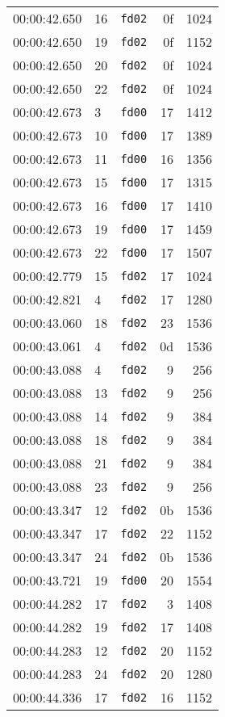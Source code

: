 \documentclass{article}
\begin{document}
\begin{longtable}{lllrr}
00:00:42.650 & 16 & \texttt{fd02} & 0f & 1024 \\
00:00:42.650 & 19 & \texttt{fd02} & 0f & 1152 \\
00:00:42.650 & 20 & \texttt{fd02} & 0f & 1024 \\
00:00:42.650 & 22 & \texttt{fd02} & 0f & 1024 \\
00:00:42.673 & 3 & \texttt{fd00} & 17 & 1412 \\
00:00:42.673 & 10 & \texttt{fd00} & 17 & 1389 \\
00:00:42.673 & 11 & \texttt{fd00} & 16 & 1356 \\
00:00:42.673 & 15 & \texttt{fd00} & 17 & 1315 \\
00:00:42.673 & 16 & \texttt{fd00} & 17 & 1410 \\
00:00:42.673 & 19 & \texttt{fd00} & 17 & 1459 \\
00:00:42.673 & 22 & \texttt{fd00} & 17 & 1507 \\
00:00:42.779 & 15 & \texttt{fd02} & 17 & 1024 \\
00:00:42.821 & 4 & \texttt{fd02} & 17 & 1280 \\
00:00:43.060 & 18 & \texttt{fd02} & 23 & 1536 \\
00:00:43.061 & 4 & \texttt{fd02} & 0d & 1536 \\
00:00:43.088 & 4 & \texttt{fd02} & 9 & 256 \\
00:00:43.088 & 13 & \texttt{fd02} & 9 & 256 \\
00:00:43.088 & 14 & \texttt{fd02} & 9 & 384 \\
00:00:43.088 & 18 & \texttt{fd02} & 9 & 384 \\
00:00:43.088 & 21 & \texttt{fd02} & 9 & 384 \\
00:00:43.088 & 23 & \texttt{fd02} & 9 & 256 \\
00:00:43.347 & 12 & \texttt{fd02} & 0b & 1536 \\
00:00:43.347 & 17 & \texttt{fd02} & 22 & 1152 \\
00:00:43.347 & 24 & \texttt{fd02} & 0b & 1536 \\
00:00:43.721 & 19 & \texttt{fd00} & 20 & 1554 \\
00:00:44.282 & 17 & \texttt{fd02} & 3 & 1408 \\
00:00:44.282 & 19 & \texttt{fd02} & 17 & 1408 \\
00:00:44.283 & 12 & \texttt{fd02} & 20 & 1152 \\
00:00:44.283 & 24 & \texttt{fd02} & 20 & 1280 \\
00:00:44.336 & 17 & \texttt{fd02} & 16 & 1152 \\

\end{longtable}
\end{document}

